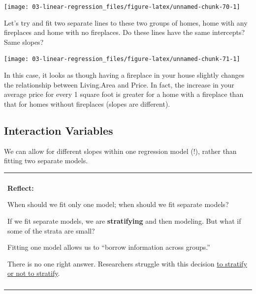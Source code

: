 \documentclass[
]{book}
\newenvironment{Shaded}{\begin{snugshade}}{\end{snugshade}}
\newcommand{\DataTypeTok}[1]{\textcolor[rgb]{0.13,0.29,0.53}{#1}}
\newcommand{\KeywordTok}[1]{\textcolor[rgb]{0.13,0.29,0.53}{\textbf{#1}}}
\newcommand{\NormalTok}[1]{#1}
\newcommand{\OperatorTok}[1]{\textcolor[rgb]{0.81,0.36,0.00}{\textbf{#1}}}
\newcommand{\OtherTok}[1]{\textcolor[rgb]{0.56,0.35,0.01}{#1}}
\newcommand{\StringTok}[1]{\textcolor[rgb]{0.31,0.60,0.02}{#1}}
\newenvironment{reflect}
{
    \begin{center}
    
    \begin{tabular}{|p{0.8\textwidth}|}
    \rowcolor{LightBlue}
    \hline\\
    \rowcolor{LightBlue}
    \textbf{Reflect:}
}
{
    \\\rowcolor{LightBlue}
    \\\hline
    \end{tabular} 
    \end{center}
}
\begin{document}
\begin{center}\texttt{[image: 03-linear-regression\_files/figure-latex/unnamed-chunk-70-1]} \end{center}

Let's try and fit two separate lines to these two groups of homes, home with any fireplaces and home with no fireplaces. Do these lines have the same intercepts? Same slopes?

\begin{Shaded}
\end{Shaded}

\begin{center}\texttt{[image: 03-linear-regression\_files/figure-latex/unnamed-chunk-71-1]} \end{center}

In this case, it looks as though having a fireplace in your house slightly changes the relationship between Living.Area and Price. In fact, the increase in your average price for every 1 square foot is greater for a home with a fireplace than that for homes without fireplaces (slopes are different).

\hypertarget{interaction-variables}{%
\subsection{Interaction Variables}\label{interaction-variables}}

We can allow for different slopes within one regression model (!), rather than fitting two separate models.

\begin{reflect}
When should we fit only one model; when should we fit separate models?

If we fit separate models, we are \textbf{stratifying} and then
modeling. But what if some of the strata are small?

Fitting one model allows us to ``borrow information across groups.''

There is no one right answer. Researchers struggle with this decision
\href{https://www.ncbi.nlm.nih.gov/pubmed/22125224}{to stratify or not
to stratify}.
\end{reflect}
\end{document}
